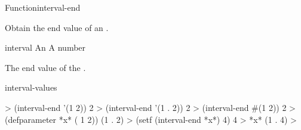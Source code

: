\documentclass[10pt,twoside,english,pdftex]{article}
\begin{document}
\begin{functiondoc}{Function}{interval-end}%
  {
    \returns{} }
%
%

\fnsyntax

\fnpurpose Obtain the end value of an .

\fnsetf
{}

\fnpackage {}

\fnmodule {}

\fnargs
\begin{args}{interval}
\arg[interval] An 
 A number
\end{args}

\fnreturns The end value of the .

\begin{alsos}{interval-values}
\end{alsos}

\fnexamples
%
%
\W\supp
\begin{example}
  > (interval-end '(1 2))
  2
  > (interval-end '(1 . 2))
  2
  > (interval-end #(1  2))
  2\goodpagebreak
  > (defparameter *x* ( 1 2))
  (1 . 2)
  > (setf (interval-end *x*) 4)
  4
  > *x*
  (1 . 4)
  >
\end{example}

\end{functiondoc}

\end{document}

